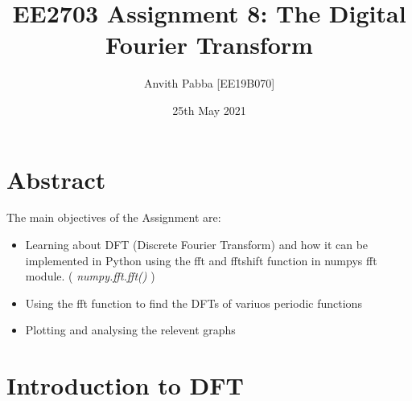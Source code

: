 \documentclass[11pt]{article}
\title{EE2703 Assignment 8: The Digital Fourier Transform}
\author{Anvith Pabba [EE19B070]}
\date{25th May 2021}
\begin{document}
\maketitle

\section{Abstract}
The main objectives of the Assignment are:
\begin{itemize}
    \item Learning about DFT (Discrete Fourier Transform) and how it can be implemented in Python using the fft and fftshift function in numpys fft module. ( \textit{numpy.fft.fft()} )
    \item Using the fft function to find the DFTs of variuos periodic functions
    \item Plotting and analysing the relevent graphs
\end{itemize}

\section{Introduction to DFT}
\end{document}
